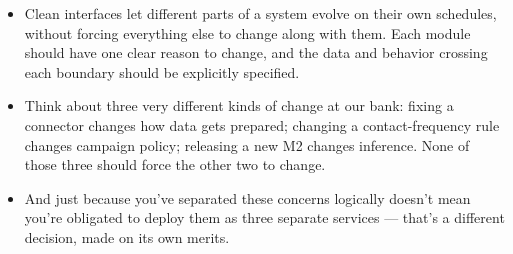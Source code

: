 \documentclass[11pt,a4paper]{article}
\begin{document}
\begin{examplebox}[title after break={SPOKEN SCRIPT --- slide 28 continued}]
\begin{itemize}
\item Clean interfaces let different parts of a system evolve on their own schedules, without forcing everything else to change along with them. Each module should have one clear reason to change, and the data and behavior crossing each boundary should be explicitly specified.
\item Think about three very different kinds of change at our bank: fixing a connector changes how data gets prepared; changing a contact-frequency rule changes campaign policy; releasing a new M2 changes inference. None of those three should force the other two to change.
\item And just because you've separated these concerns logically doesn't mean you're obligated to deploy them as three separate services — that's a different decision, made on its own merits.
\end{itemize}
\end{examplebox}
\par\noindent{\scriptsize\textcolor{teal!60!black}{Reading anchor: Kalinowski, Ch. 14 · Nazir et al. (2024)}}
\clearpage
\end{document}
